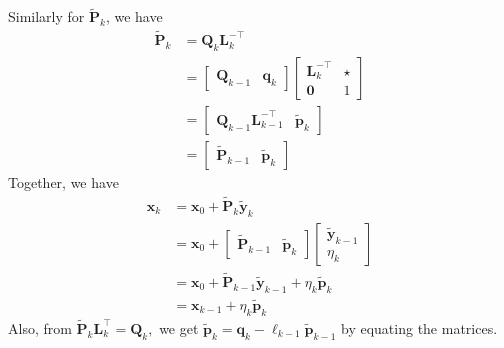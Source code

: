 \documentclass[12pt,a4paper]{article} %
\begin{document}
Similarly for $\mathbf {\tilde P}_k$, we have 
\begin{align*} 
\tilde{\mathbf{P}}_{k} &=\mathbf{Q}_{k} \mathbf{L}_{k}^{-\top} \\ 
&= \begin{bmatrix}
    \mathbf Q_{k-1} & \bm q_k
\end{bmatrix}\begin{bmatrix}
    \mathbf L_k^{-\top} & \star \\ 
    \bm 0 & 1
\end{bmatrix} \\ 
&= \begin{bmatrix}
    \mathbf Q_{k-1} \mathbf L_{k-1}^{-\top} & \bm {\tilde p}_k
\end{bmatrix} \\ 
&= \begin{bmatrix}
    \mathbf {\tilde P}_{k-1} & \bm {\tilde p}_k
\end{bmatrix} 
\end{align*}
Together, we have 
\begin{align*}
    \bm x_k &= \bm x_0 + \mathbf {\tilde P}_k \bm {\tilde y}_k \\ 
    &= \bm x_0 + \begin{bmatrix}
        \mathbf {\tilde P}_{k-1} & \bm {\tilde p}_k
    \end{bmatrix} \begin{bmatrix}
        \bm {\tilde y}_{k-1} \\ \eta_k
    \end{bmatrix} \\ 
    &= \bm x_0 + \mathbf {\tilde P}_{k-1} \bm {\tilde y}_{k-1} + \eta_k \bm {\tilde p}_k \\ 
    &= \bm x_{k-1} + \eta_k \bm {\tilde p}_k
\end{align*}
Also, from $\tilde{\mathbf{P}}_{k} \mathbf{L}_{k}^{\top}=\mathbf{Q}_{k},$ we get $\tilde{\bm{p}}_{k}=\bm{q}_{k}-\ell_{k-1} \tilde{\bm{p}}_{k-1}$ 
by equating the matrices.
\end{document}
